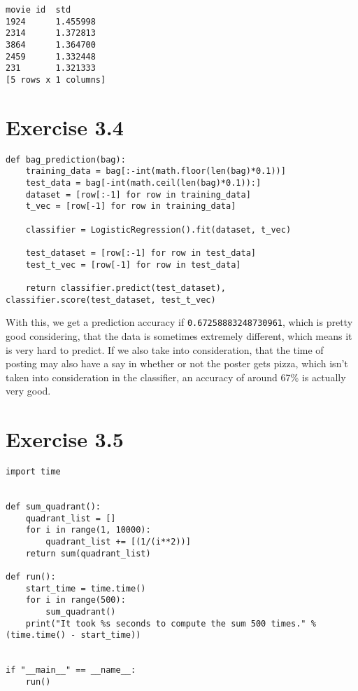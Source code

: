 \documentclass{article}
\begin{document}
\begin{verbatim}
movie id  std
1924      1.455998
2314      1.372813
3864      1.364700
2459      1.332448
231       1.321333
[5 rows x 1 columns]
\end{verbatim}

\section{Exercise 3.4}

\begin{lstlisting}
def bag_prediction(bag):
    training_data = bag[:-int(math.floor(len(bag)*0.1))]
    test_data = bag[-int(math.ceil(len(bag)*0.1)):]
    dataset = [row[:-1] for row in training_data]
    t_vec = [row[-1] for row in training_data]

    classifier = LogisticRegression().fit(dataset, t_vec)

    test_dataset = [row[:-1] for row in test_data]
    test_t_vec = [row[-1] for row in test_data]

    return classifier.predict(test_dataset), classifier.score(test_dataset, test_t_vec)
\end{lstlisting}

With this, we get a prediction accuracy if \texttt{0.67258883248730961}, which is pretty good considering, that the data is sometimes extremely different, which means it is very hard to predict. If we also take into consideration, that the time of posting may also have a say in whether or not the poster gets pizza, which isn't taken into consideration in the classifier, an accuracy of around 67\% is actually very good.

\section{Exercise 3.5}

\begin{lstlisting}
import time


def sum_quadrant():
    quadrant_list = []
    for i in range(1, 10000):
        quadrant_list += [(1/(i**2))]
    return sum(quadrant_list)

def run():
    start_time = time.time()
    for i in range(500):
        sum_quadrant()
    print("It took %s seconds to compute the sum 500 times." % (time.time() - start_time))


if "__main__" == __name__:
    run()
\end{lstlisting}
\end{document}
